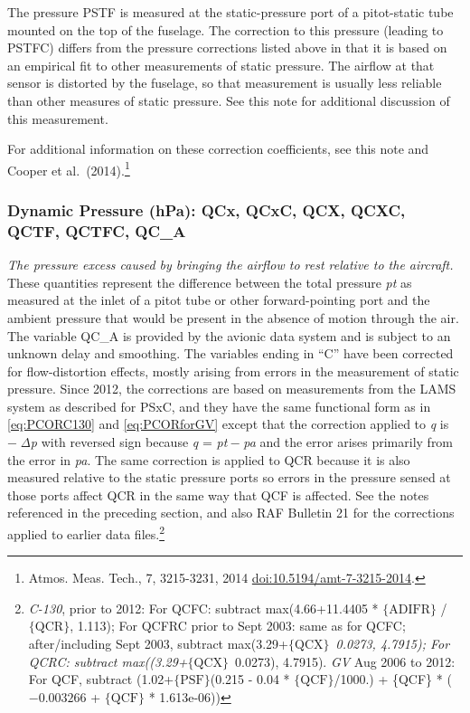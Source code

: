 \documentclass[
]{book}
\begin{document}
The pressure PSTF is measured at the static-pressure port of a pitot-static tube mounted on the top of the fuselage. The correction to this pressure (leading to PSTFC) differs from the pressure corrections listed above in that it is based on an empirical fit to other measurements of static pressure. The airflow at that sensor is distorted by the fuselage, so that measurement is usually less reliable than other measures of static pressure. See this note for additional discussion of this measurement.

For additional information on these correction coefficients, see this note and Cooper et al.~(2014).\footnote{Atmos. Meas. Tech., 7, 3215-3231, 2014 \url{doi:10.5194/amt-7-3215-2014}.}

\hypertarget{qcx}{%
\subsubsection*{Dynamic Pressure (hPa): QCx, QCxC, QCX, QCXC, QCTF, QCTFC, QC\_A}\label{qcx}}

\emph{The pressure excess caused by bringing the airflow to rest relative to the aircraft.} These quantities represent the difference between the total pressure {\emph{p}\emph{t}} as measured at the inlet of a pitot tube or other forward-pointing port and the ambient pressure that would be present in the absence of motion through the air. The variable QC\_A is provided by the avionic data system and is subject to an unknown delay and smoothing. The variables ending in ``C'' have been corrected for flow-distortion effects, mostly arising from errors in the measurement of static pressure. Since 2012, the corrections are based on measurements from the LAMS system as described for PSxC, and they have the same functional form as in \eqref{eq:PCORC130} and
\eqref{eq:PCORforGV} except that the correction applied to {\emph{q}} is { − \emph{Δp}} with reversed sign because {\emph{q} = \emph{p}\emph{t} − \emph{p}\emph{a}} and the error arises primarily from the error in {\emph{p}\emph{a}}. The same correction is applied to QCR because it is also measured relative to the static pressure ports so errors in the pressure sensed at those ports affect QCR in the same way that QCF is affected. See the notes referenced in the preceding section, and also RAF Bulletin 21 for the corrections applied to earlier data files.\footnote{\emph{C-130}, prior to 2012: For QCFC: subtract max(4.66+11.4405 * \(\mathrm{\{ADIFR\}}\) / \(\mathrm{\{QCR\}}\), 1.113); For QCFRC prior to Sept 2003: same as for QCFC; after/including Sept 2003, subtract max(3.29+\(\mathrm{\{QCX\}}\) \emph{ 0.0273, 4.7915); For QCRC: subtract max((3.29+\(\mathrm{\{QCX\}}\) } 0.0273), 4.7915). \emph{GV} Aug 2006 to 2012: For QCF, subtract (1.02+\(\mathrm{\{PSF\}}\)(0.215 - 0.04 * \(\mathrm{\{QCF\}}\)/1000.) + \{QCF\} * (\(-0.003266\) + \(\mathrm{\{QCF\}}\) * 1.613e-06))}
\end{document}
